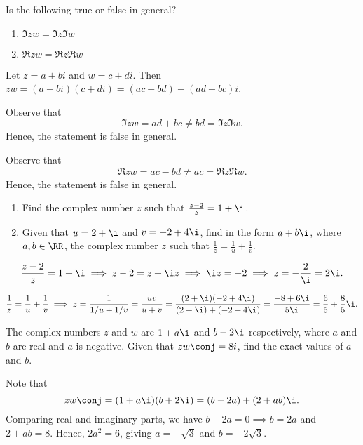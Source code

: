 \begin{problem}
    Is the following true or false in general?
    \begin{enumerate}
        \item $\Im{zw} = \Im{z} \Im{w}$
        \item $\Re{zw} = \Re{z} \Re{w}$
    \end{enumerate}
\end{problem}
\begin{solution}
    Let $z = a + bi$ and $w = c + di$. Then $zw = (a+bi)(c+di) = (ac-bd) + (ad+bc)i$.

    \begin{ppart}
        Observe that \[\Im{zw} = ad+bc \neq bd = \Im{z}\Im{w}.\] Hence, the statement is false in general.
    \end{ppart}
    \begin{ppart}
        Observe that \[\Re{zw} = ac-bd \neq ac = \Re{z}\Re{w}.\] Hence, the statement is false in general.
    \end{ppart}
\end{solution}

\begin{problem}
    \begin{enumerate}
        \item Find the complex number $z$ such that $\frac{z-2}{z} = 1 + \i$.
        \item Given that $u = 2 + \i$ and $v = -2 + 4\i$, find in the form $a + b\i$, where $a, b \in \RR$, the complex number $z$ such that $\frac1z = \frac1u + \frac1v$.
    \end{enumerate}
\end{problem}
\begin{solution}
    \begin{ppart}
        \[\frac{z-2}{z} = 1 + \i \implies z-2 = z + \i z \implies \i z = -2 \implies z = -\frac{2}{\i} = 2\i.\]
    \end{ppart}
    \begin{ppart}
        \[\frac1z = \frac1u + \frac1v \implies z = \frac1{1/u + 1/v} = \frac{uv}{u + v} = \frac{(2+\i)(-2+4\i)}{(2+\i) + (-2+4\i)} = \frac{-8 + 6\i}{5\i} = \frac65 + \frac85 \i.\]
    \end{ppart}
\end{solution}

\begin{problem}
    The complex numbers $z$ and $w$ are $1 + a\i$ and $b - 2\i$ respectively, where $a$ and $b$ are real and $a$ is negative. Given that $zw\conj = 8i$, find the exact values of $a$ and $b$.
\end{problem}
\begin{solution}
    Note that \[zw\conj = (1+a\i)(b+2\i) = (b - 2a) + (2+ab)\i.\] Comparing real and imaginary parts, we have $b-2a = 0 \implies b = 2a$ and $2+ab = 8$. Hence, $2a^2 = 6$, giving $a = -\sqrt3$ and $b = -2\sqrt3$.
\end{solution}

